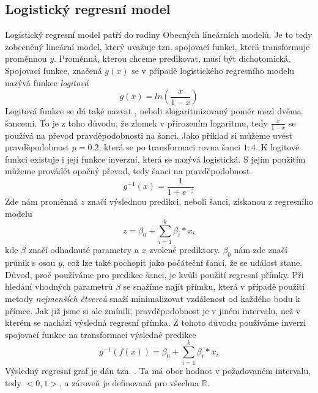 \subsection{Logistický regresní model}
Logistický regresní model patří do rodiny Obecných lineárních modelů. Je to tedy zobecněný lineární model, který uvažuje tzn. spojovací funkci, která transformuje
proměnnou $y$. Proměnná, kterou chceme predikovat, musí být dichotomická. Spojovací funkce, značená $g(x)$ se v případě logistického regresního modelu nazývá funkce
\textit{logitová} \cite{Hebak2015}
\begin{equation}
    \label{eq:spojovaci_fce}
    g(x) = ln\left(\frac{x}{1 - x}\right)
\end{equation}
Logitová funkce se dá také nazvat , neboli zlogaritmizovaný poměr mezi dvěma šancemi. To je z toho důvodu, že zlomek v přirozením logaritmu, tedy
$\frac{x}{1-x}$ se používá na převod pravděpodobnosti na šanci. Jako příklad si můžeme uvést pravděpodobnost $p = 0.2$, která se po transformaci rovna šanci $1:4$.
K logitové funkci existuje i její funkce inverzní, která se nazývá logistická. S jejím použitím můžeme provádět opačný převod, tedy šanci na pravděpodobnost.
\begin{equation}
    \label{eq:logisticka_fce}
    g^{-1}(x) = \frac{1}{1 + e^{-z}}
\end{equation}
Zde nám proměnná $z$ značí výslednou predikci, neboli šanci, získanou z regresního modelu
\begin{equation}
    z = \beta_0 + \sum_{i=1}^k \beta_i*x_i
\end{equation}
kde $\beta$ značí odhadnuté parametry a $x$ zvolené prediktory. $\beta_0$ nám zde značí průnik s osou $y$, což lze také pochopit jako počáteční šanci, že se událost stane.
Důvod, proč používáme pro predikce šanci, je kvůli použití regresní přímky. Při hledání vhodných parametrů $\beta$ se snažíme najít přímku, která v případě použití 
metody \textit{nejmenších čtverců} snaží minimalizovat vzdálenost od každého bodu k přímce. Jak již jsme si ale zmínili, pravděpodobnost je v jiném intervalu, než v kterém
se nachází výsledná regresní přímka. Z tohoto důvodu používáme inverzi spojovací funkce na transformaci výsledné predikce
\begin{equation}
    g^{-1}(f(x)) = \beta_0 + \sum_{i=1}^k \beta_i*x_i
\end{equation}
Výsledný regresní graf je dán tzn. . Ta má obor hodnot v požadovaném intervalu, tedy $<0, 1>$, a zároveň je definovaná pro
všechna $\mathbb{R}$.

